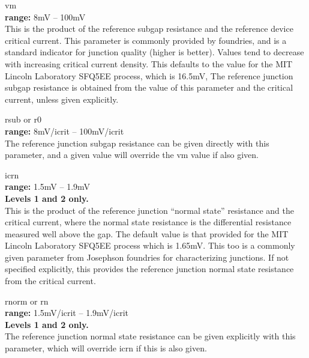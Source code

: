 \begin{description}
\item{\vt vm}\\
{\bf range:} 8mV -- 100mV\\
This is the product of the reference subgap resistance and the
reference device critical current.  This parameter is commonly
provided by foundries, and is a standard indicator for junction
quality (higher is better).  Values tend to decrease with increasing
critical current density.  This defaults to the value for the MIT
Lincoln Laboratory SFQ5EE process\cite{tolpygo}, which is 16.5mV, The
reference junction subgap resistance is obtained from the value of
this parameter and the critical current, unless given explicitly.

\item{{\vt rsub} or {\vt r0}}\\
{\bf range:} 8mV/{\vt icrit} -- 100mV/{\vt icrit}\\
The reference junction subgap resistance can be given directly
with this parameter, and a given value will override the
{\vt vm} value if also given.

\item{\vt icrn}\\
{\bf range:} 1.5mV -- 1.9mV\\
{\bf Levels 1 and 2 only.}\\
This is the product of the reference junction ``normal state''
resistance and the critical current, where the normal state resistance
is the differential resistance measured well above the gap.  The
default value is that provided for the MIT Lincoln Laboratory SFQ5EE
process\cite{tolpygo} which is 1.65mV.  This too is a commonly given
parameter from Josephson foundries for characterizing junctions.  If
not specified explicitly, this provides the reference junction normal
state resistance from the critical current.

\item{{\vt rnorm} or {\vt rn}}\\
{\bf range:} 1.5mV/{\vt icrit} -- 1.9mV/{\vt icrit}\\
{\bf Levels 1 and 2 only.}\\
The reference junction normal state resistance can be given explicitly
with this parameter, which will override {\vt icrn} if this is also
given.


\end{description}

